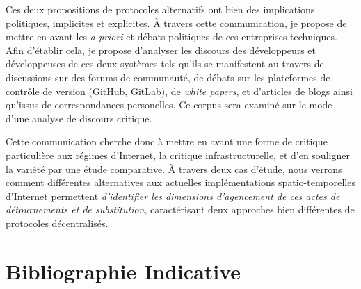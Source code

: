\documentclass{article}
\begin{document}
Ces deux propositions de protocoles alternatifs ont bien des implications politiques, implicites et explicites. À travers cette communication, je propose de mettre en avant les \emph{a priori} et débats politiques de ces entreprises techniques. Afin d'établir cela, je propose d'analyser les discours des développeurs et développeuses de ces deux systèmes tels qu'ils se manifestent au travers de discussions sur des forums de communauté, de débats sur les plateformes de contrôle de version (GitHub, GitLab), de \emph{white papers}, et d'articles de blogs ainsi qu'issus de correspondances personelles. Ce corpus sera examiné sur le mode d'une analyse de discours critique.

Cette communication cherche donc à mettre en avant une forme de critique particulière aux régimes d'Internet, la critique infrastructurelle, et d'en souligner la variété par une étude comparative. À travers deux cas d'étude, nous verrons comment différentes alternatives aux actuelles implémentations spatio-temporelles d'Internet permettent \emph{d'identifier les dimensions d'agencement de ces actes de détournements et de substitution}, caractérisant deux approches bien différentes de protocoles décentralisés.

\pagebreak

\section{Bibliographie Indicative}



\end{document}
